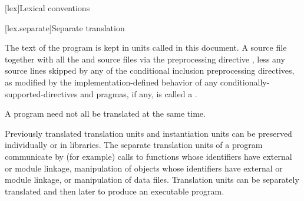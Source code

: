 [lex]{Lexical conventions}



[lex.separate]{Separate translation}

\pnum
{}%
%
The text of the program is kept in units called
 in this document.
A source file together with all the 
and source files  via the preprocessing
directive , less any source lines skipped by any of the
conditional inclusion preprocessing directives,
as modified by the implementation-defined behavior of any
conditionally-supported-directives and pragmas,
if any, is
called a .
\begin{note}
A \Cpp{} program need not all be translated at the same time.
\end{note}

\pnum
\begin{note}
Previously translated translation units and instantiation
units can be preserved individually or in libraries. The separate
translation units of a program communicate by (for
example)
calls to functions whose identifiers have external or module linkage,
manipulation of objects whose identifiers have external or module linkage, or
manipulation of data files. Translation units can be separately
translated and then later  to produce an executable
program.
\end{note}

